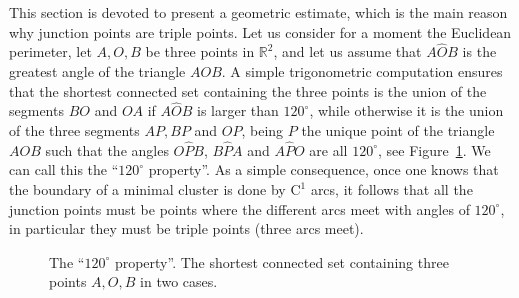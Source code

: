 \documentclass[JEP,XML,SOM,Unicode,NoFloatCountersInSection]{cedram}
\newcommand\R{\mathbb{R}}
\def\angle#1#2#3{#1\widehat{#2}#3}
\theoremstyle{plain}
\theoremstyle{definition}
\begin{document}
This section is devoted to present a geometric estimate, which is the main reason why junction points are triple points. Let us consider for a moment the Euclidean perimeter, let $A,O,B$ be three points in $\R^2$, and let us assume that $\angle AOB$ is the greatest angle of the triangle $AOB$. A simple trigonometric computation ensures that the shortest connected set containing the three points is the union of the segments $BO$ and $OA$ if $\angle AOB$ is larger than $120^\circ$, while otherwise it is the union of the three segments $AP, BP$ and $OP$, being $P$ the unique point of the triangle $AOB$ such that the angles $\angle OPB$, $\angle BPA$ and $\angle APO$ are all $120^\circ$, see Figure~\ref{Fig120}. We can call this the ``$120^\circ$ property''. As a simple consequence, once one knows that the boundary of a minimal cluster is done by $\mathrm{C}^1$ arcs, it follows that all the junction points must be points where the different arcs meet with angles of $120^\circ$, in particular they must be triple points (\ie three arcs meet).\par
\begin{figure}[htbp]
\caption{The ``$120^\circ$ property''. The shortest connected set containing three points $A, O,B$ in two cases.}\label{Fig120}
\end{figure}
\end{document}
